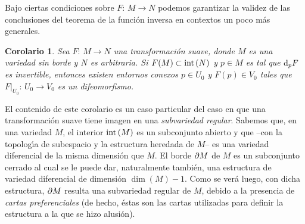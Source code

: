 \theoremstyle{plain}
\newtheorem{coroFunInvVar}{Corolario}[section]
\newtheorem{propoAbiertoEsSubvariedadRegular}[coroFunInvVar]{Proposici\'{o}n}
\newtheorem{propoBordeEsSubvariedadRegular}[coroFunInvVar]{Proposici\'{o}n}
\newtheorem{propoDiferencialInvertibleCaeEnElInterior}[coroFunInvVar]%
	{Proposici\'{o}n}
\newtheorem{coroCaeEnElInterior}[coroFunInvVar]{Corolario}
\newtheorem{propoDifeoLocalExtra}[coroFunInvVar]{Proposici\'{o}n}

\theoremstyle{remark}


Bajo ciertas condiciones sobre $F:\,M\rightarrow N$ podemos garantizar
la validez de las conclusiones del teorema de la funci\'{o}n inversa en
contextos un poco m\'{a}s generales.

\begin{coroFunInvVar}\label{thm:funinvvarconborde}
	Sea $F:\,M\rightarrow N$ una transformaci\'{o}n suave, donde
	$M$ es una variedad \emph{sin} borde y $N$ es arbitraria. Si
	$F(M)\subset\interior{N}$ y $p\in M$ es tal que $\diferencial[p]{F}$
	es invertible, entonces existen entornos conexos $p\in U_{0}$
	y $F(p)\in V_{0}$ tales que $F|_{U_{0}}:\,U_{0}\rightarrow V_{0}$
	es un difeomorfismo.
\end{coroFunInvVar}

El contenido de este corolario es un caso particular del caso en que una
transformaci\'{o}n suave tiene imagen en una \emph{subvariedad regular}.
Sabemos que, en una variedad $M$, el interior $\interior{M}$ es un
subconjunto abierto y que --con la topolog\'{\i}a de subespacio y la
estructura heredada de $M$-- es una variedad diferencial de la misma
dimensi\'{o}n que $M$. El borde $\borde[M]$ de $M$ es un subconjunto cerrado
al cual se le puede dar, naturalmente tambi\'{e}n, una estructura de
variedad diferencial de dimensi\'{o}n $\dim(M)-1$. Como se ver\'{a} luego,
con dicha estructura, $\borde[M]$ resulta una subvariedad regular de $M$,
debido a la presencia de \emph{cartas preferenciales} (de hecho, \'{e}stas
son las cartas utilizadas para definir la estructura a la que se hizo
alusi\'{o}n).

